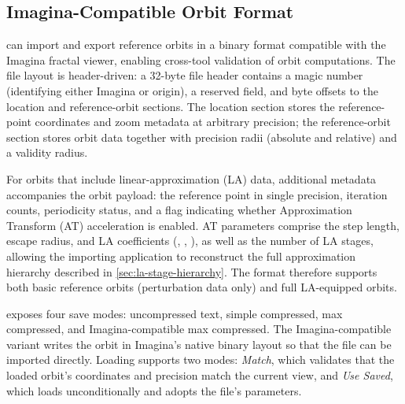 \subsection{Imagina-Compatible Orbit Format}
\label{subsec:imagina-format}

\FractalShark{} can import and export reference orbits in a binary format
compatible with the Imagina fractal viewer, enabling cross-tool validation of
orbit computations.  The file layout is header-driven: a 32-byte file header
contains a magic number (identifying either Imagina or \FractalShark{} origin), a
reserved field, and byte offsets to the location and reference-orbit sections.
The location section stores the reference-point coordinates and zoom metadata at
arbitrary precision; the reference-orbit section stores orbit data together with
precision radii (absolute and relative) and a validity radius.

For orbits that include linear-approximation (LA) data, additional metadata
accompanies the orbit payload: the reference point in single precision,
iteration counts, periodicity status, and a flag indicating whether Approximation
Transform (AT) acceleration is enabled.  AT parameters comprise the step
length, escape radius, and LA coefficients (, ,
), as well as the number of LA stages, allowing the importing
application to reconstruct the full approximation hierarchy described in
\cref{sec:la-stage-hierarchy}.  The format therefore supports both basic
reference orbits (perturbation data only) and full LA-equipped orbits.

\FractalShark{} exposes four save modes: uncompressed text, simple compressed,
max compressed, and Imagina-compatible max compressed.  The Imagina-compatible
variant writes the orbit in Imagina's native binary layout so that the file can
be imported directly.  Loading supports two modes: \emph{Match}, which validates
that the loaded orbit's coordinates and precision match the current view, and
\emph{Use Saved}, which loads unconditionally and adopts the file's parameters.
